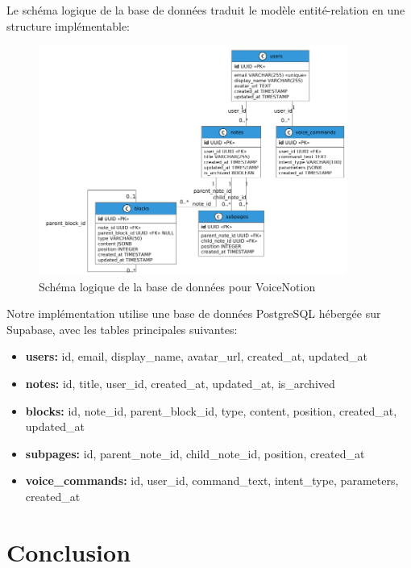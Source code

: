 Le schéma logique de la base de données traduit le modèle entité-relation en une structure implémentable:

\begin{figure}[H]
    \centering
    \includegraphics[width=0.9\textwidth]{assets/docs/voicenotion_db_schema.png}
    \caption{Schéma logique de la base de données pour VoiceNotion}
    \label{fig:db_schema}
\end{figure}

Notre implémentation utilise une base de données PostgreSQL hébergée sur Supabase, avec les tables principales suivantes:

\begin{itemize}
    \item \textbf{users:} id, email, display\_name, avatar\_url, created\_at, updated\_at
    
    \item \textbf{notes:} id, title, user\_id, created\_at, updated\_at, is\_archived
    
    \item \textbf{blocks:} id, note\_id, parent\_block\_id, type, content, position, created\_at, updated\_at
    
    \item \textbf{subpages:} id, parent\_note\_id, child\_note\_id, position, created\_at
    
    \item \textbf{voice\_commands:} id, user\_id, command\_text, intent\_type, parameters, created\_at
\end{itemize}

\section{Conclusion}


